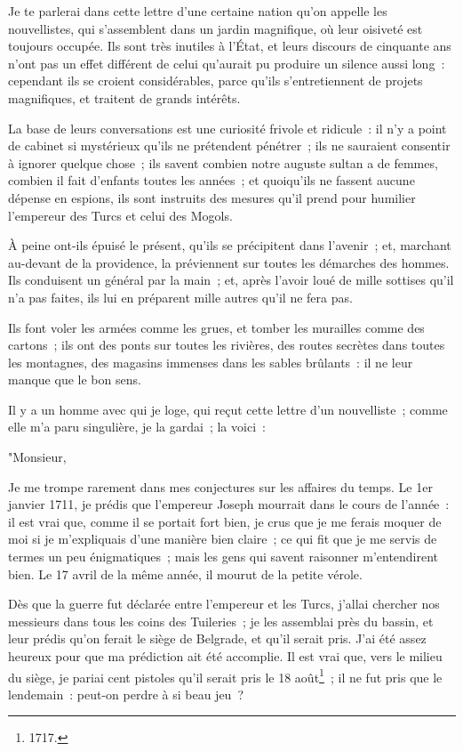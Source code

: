 \documentclass[french,twoside]{book} %
\begin{document}
\noindent Je te parlerai dans cette lettre d’une certaine nation qu’on appelle les nouvellistes, qui s’assemblent dans un jardin magnifique, où leur oisiveté est toujours occupée. Ils sont très inutiles à l’État, et leurs discours de cinquante ans n’ont pas un effet différent de celui qu’aurait pu produire un silence aussi long : cependant ils se croient considérables, parce qu’ils s’entretiennent de projets magnifiques, et traitent de grands intérêts.\par
La base de leurs conversations est une curiosité frivole et ridicule : il n’y a point de cabinet si mystérieux qu’ils ne prétendent pénétrer ; ils ne sauraient consentir à ignorer quelque chose ; ils savent combien notre auguste sultan a de femmes, combien il fait d’enfants toutes les années ; et quoiqu’ils ne fassent aucune dépense en espions, ils sont instruits des mesures qu’il prend pour humilier l’empereur des Turcs et celui des Mogols.\par
À peine ont-ils épuisé le présent, qu’ils se précipitent dans l’avenir ; et, marchant au-devant de la providence, la préviennent sur toutes les démarches des hommes. Ils conduisent un général par la main ; et, après l’avoir loué de mille sottises qu’il n’a pas faites, ils lui en préparent mille autres qu’il ne fera pas.\par
Ils font voler les armées comme les grues, et tomber les murailles comme des cartons ; ils ont des ponts sur toutes les rivières, des routes secrètes dans toutes les montagnes, des magasins immenses dans les sables brûlants : il ne leur manque que le bon sens.\par
Il y a un homme avec qui je loge, qui reçut cette lettre d’un nouvelliste ; comme elle m’a paru singulière, je la gardai ; la voici :\par
"Monsieur,\par
Je me trompe rarement dans mes conjectures sur les affaires du temps. Le 1er janvier 1711, je prédis que l’empereur Joseph mourrait dans le cours de l’année : il est vrai que, comme il se portait fort bien, je crus que je me ferais moquer de moi si je m’expliquais d’une manière bien claire ; ce qui fit que je me servis de termes un peu énigmatiques ; mais les gens qui savent raisonner m’entendirent bien. Le 17 avril de la même année, il mourut de la petite vérole.\par
Dès que la guerre fut déclarée entre l’empereur et les Turcs, j’allai chercher nos messieurs dans tous les coins des Tuileries ; je les assemblai près du bassin, et leur prédis qu’on ferait le siège de Belgrade, et qu’il serait pris. J’ai été assez heureux pour que ma prédiction ait été accomplie. Il est vrai que, vers le milieu du siège, je pariai cent pistoles qu’il serait pris le 18 août\footnote{1717.} ; il ne fut pris que le lendemain : peut-on perdre à si beau jeu ?\par
\end{document}
